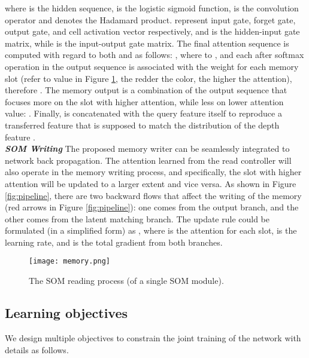 \documentclass[letterpaper]{article} \usepackage{aaai20}  \usepackage{times}  \usepackage{helvet} \usepackage{courier}  \usepackage{graphicx} \frenchspacing  \setlength{\pdfpagewidth}{8.5in}  \setlength{\pdfpageheight}{11in}  \usepackage{epsfig}
\begin{document}
    where  is the hidden sequence,  is the logistic sigmoid function,  is the convolution operator and  denotes the Hadamard product.  represent input gate, forget gate, output gate, and cell activation vector respectively,  and  is the hidden-input gate matrix, while  is the input-output gate matrix.
    The final attention sequence  is computed with regard to both  and  as follows:
    ,
    where  to , and each  after softmax operation in the output sequence is associated with the weight for each memory slot  (refer to  value in Figure \ref{fig:memory}, the redder the color, the higher the attention), therefore . The memory output  is a combination of the output sequence that focuses more on the slot with higher attention, while less on lower attention value:  .
    Finally,  is concatenated with the query feature itself to reproduce a transferred feature  that is supposed to match the distribution of the depth feature . \\
    \indent\textbf{\textit{SOM Writing}} The proposed memory writer can be seamlessly integrated to network back propagation. The attention learned from the read controller will also operate in the memory writing process, and specifically, the slot with higher attention will be updated to a larger extent and vice versa. As shown in Figure \ref{fig:pipeline}, there are two backward flows that affect the writing of the memory (red arrows in Figure \ref{fig:pipeline}): one comes from the output branch, and the other comes from the latent matching branch. The update rule could be formulated (in a simplified form) as 
    , where  is the attention for each slot,  is the learning rate, and  is the total gradient from both branches.
    \begin{figure}[t]
    	\centering
    	\texttt{[image: memory.png]}
    	\vspace{-10pt}
    	\caption{The SOM reading process (of a single SOM module).}
    	\label{fig:memory}
    	\vspace{-15pt}
    \end{figure}
    
    \subsection{Learning objectives}
    We design multiple objectives to constrain the joint training of the network with details as follows.
    
\end{document}
